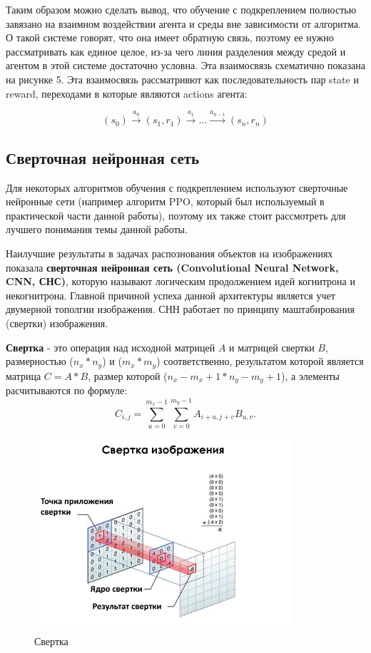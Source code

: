 \documentclass[bachelor, och, coursework]{shiza}
\begin{document}
Таким образом можно сделать вывод, что обучение с подкреплением полностью завязано на взаимном воздействии агента и среды вне зависимости от алгоритма.
О такой системе говорят, что она имеет обратную связь, поэтому ее нужно рассматривать как единое целое, из-за чего линия разделения между средой и агентом
в этой системе достаточно условна. Эта взаимосвязь схематично показана на рисунке 5. Эта взаимосвязь рассматривют как последовательность пар state и
reward, переходами в которые являются actions агента:

\begin{equation}
    (s_0) \stackrel{a_0}{\rightarrow} (s_1, r_1) \stackrel{a_1}{\rightarrow} ... \stackrel{a_{n-1}}{\rightarrow} (s_n, r_n)
\end{equation}

\subsection{Сверточная нейронная сеть}

Для некоторых алгоритмов обучения с подкреплением используют сверточные нейронные сети (например алгоритм PPO, который был используемый в практической части данной работы),
поэтому их также стоит рассмотреть для лучшего понимания темы данной работы.

Наилучшие результаты в задачах распознования объектов на изображениях показала \textbf{сверточная нейронная сеть (Convolutional Neural Network, CNN, СНС)}, 
которую называют логическим продолжением идей когнитрона и некогнитрона. Главной причиной успеха данной архитектуры является учет двумерной тополгии изображения.
СНН работает по принципу маштабирования (свертки) изображения.

\textbf{Свертка} - это операция над исходной матрицей $A$ и матрицей свертки $B$, размерностью  ($n_x * n_y$) и ($m_x * m_y$) соответственно, результатом которой является матрица $C = A * B$,
размер которой ($n_x - m_x + 1 * n_y - m_y + 1$), а элементы расчитываются по формуле:
\begin{equation}
    C_{i,j} = \sum\limits_{u=0}^{m_x-1}\sum\limits_{v=0}^{m_y-1}A_{i+u,j+v}B_{u,v}.
\end{equation}

\begin{figure}[H]
    \centering
    \includegraphics[width=0.85\textwidth]{pic/6}
    \caption{Свертка}
    \label{fig:img1}
\end{figure}
\end{document}
